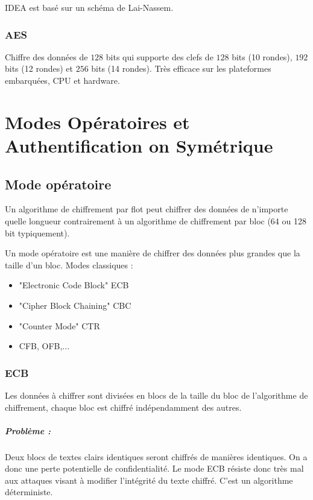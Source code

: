 \documentclass[11pt,a4paper]{report}
\begin{document}
IDEA est basé sur un schéma de Lai-Nassem.

\subsection{AES}

Chiffre des données de $128$ bits qui supporte des clefs de $128$ bits (10 rondes), $192$ bits (12 rondes) et $256$ bits (14 rondes). Très efficace sur les plateformes embarquées, CPU et hardware.

\chapter{Modes Opératoires et Authentification on Symétrique}

\section{Mode opératoire}

Un algorithme de chiffrement par flot peut chiffrer des données de n'importe quelle longueur contrairement à un algorithme de chiffrement par bloc (64 ou 128 bit typiquement).

Un mode opératoire est une manière de chiffrer des données plus grandes que la taille d'un bloc. Modes classiques :
\begin{itemize}
    \item "Electronic Code Block" ECB
    \item "Cipher Block Chaining" CBC
    \item "Counter Mode" CTR
    \item CFB, OFB,...
\end{itemize}

\subsection{ECB}

Les données à chiffrer sont divisées en blocs de la taille du bloc de l'algorithme de chiffrement, chaque bloc est chiffré indépendamment des autres.

\paragraph*{Problème : } Deux blocs de textes clairs identiques seront chiffrés de manières identiques. On a donc une perte potentielle de confidentialité. Le mode ECB résiste donc très mal aux attaques visant à modifier l'intégrité du texte chiffré. C'est un algorithme déterministe.
\end{document}
